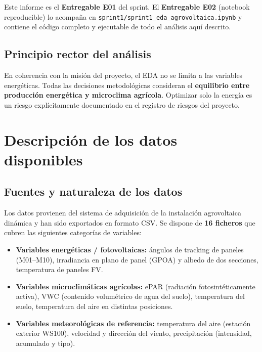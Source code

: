 \documentclass[12pt, a4paper]{article}
\begin{document}
Este informe es el \textbf{Entregable E01} del sprint. El \textbf{Entregable E02} (notebook reproducible) lo acompaña en \texttt{sprint1/sprint1\_eda\_agrovoltaica.ipynb} y contiene el código completo y ejecutable de todo el análisis aquí descrito.

\subsection{Principio rector del análisis}

En coherencia con la misión del proyecto, el EDA no se limita a las variables energéticas. Todas las decisiones metodológicas consideran el \textbf{equilibrio entre producción energética y microclima agrícola}. Optimizar solo la energía es un riesgo explícitamente documentado en el registro de riesgos del proyecto.

\section{Descripción de los datos disponibles}

\subsection{Fuentes y naturaleza de los datos}

Los datos provienen del sistema de adquisición de la instalación agrovoltaica dinámica y han sido exportados en formato CSV. Se dispone de \textbf{16 ficheros} que cubren las siguientes categorías de variables:

\begin{itemize}[leftmargin=1.5cm]
    \item \textbf{Variables energéticas / fotovoltaicas:} ángulos de tracking de paneles (M01–M10), irradiancia en plano de panel (GPOA) y albedo de dos secciones, temperatura de paneles FV.
    \item \textbf{Variables microclimáticas agrícolas:} ePAR (radiación fotosintéticamente activa), VWC (contenido volumétrico de agua del suelo), temperatura del suelo, temperatura del aire en distintas posiciones.
    \item \textbf{Variables meteorológicas de referencia:} temperatura del aire (estación exterior WS100), velocidad y dirección del viento, precipitación (intensidad, acumulado y tipo).
\end{itemize}
\end{document}
